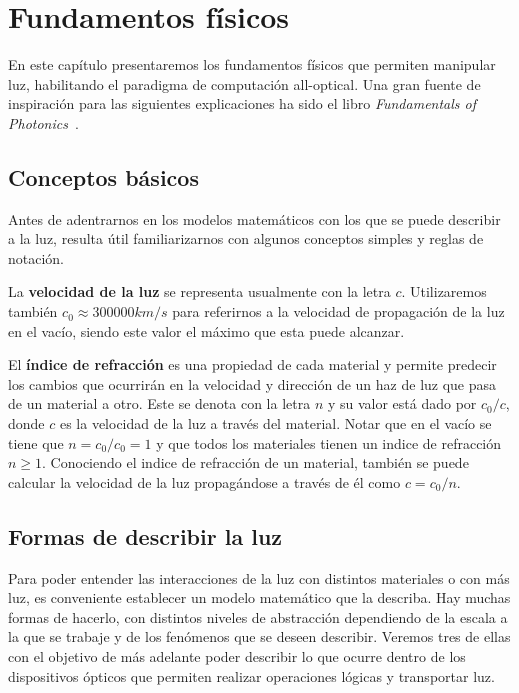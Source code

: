 \documentclass[12pt,a4paper]{report}
\begin{document}
\chapter{Fundamentos físicos}

En este capítulo presentaremos los fundamentos físicos que permiten manipular luz, habilitando el paradigma de computación all-optical. Una gran fuente de inspiración para las siguientes explicaciones ha sido el libro \textit{Fundamentals of Photonics}~\cite{FundamentalsOfPhotonics}.

\section{Conceptos básicos}

Antes de adentrarnos en los modelos matemáticos con los que se puede describir a la luz, resulta útil familiarizarnos con algunos conceptos simples y reglas de notación.

La \textbf{velocidad de la luz} se representa usualmente con la letra $c$. Utilizaremos también $c_0 \approx 300000km/s$ para referirnos a la velocidad de propagación de la luz en el vacío, siendo este valor el máximo que esta puede alcanzar.

El \textbf{índice de refracción} es una propiedad de cada material y permite predecir los cambios que ocurrirán en la velocidad y dirección de un haz de luz que pasa de un material a otro. Este se denota con la letra $n$ y su valor está dado por $c_0/c$, donde $c$ es la velocidad de la luz a través del material. Notar que en el vacío se tiene que $n = c_0/c_0 = 1$ y que todos los materiales tienen un indice de refracción $n \geq 1$. Conociendo el indice de refracción de un material, también se puede calcular la velocidad de la luz propagándose a través de él como $c = c_0/n$.

\section{Formas de describir la luz}

Para poder entender las interacciones de la luz con distintos materiales o con más luz, es conveniente establecer un modelo matemático que la describa. Hay muchas formas de hacerlo, con distintos niveles de abstracción dependiendo de la escala a la que se trabaje y de los fenómenos que se deseen describir. Veremos tres de ellas con el objetivo de más adelante poder describir lo que ocurre dentro de los dispositivos ópticos que permiten realizar operaciones lógicas y transportar luz.
\end{document}
